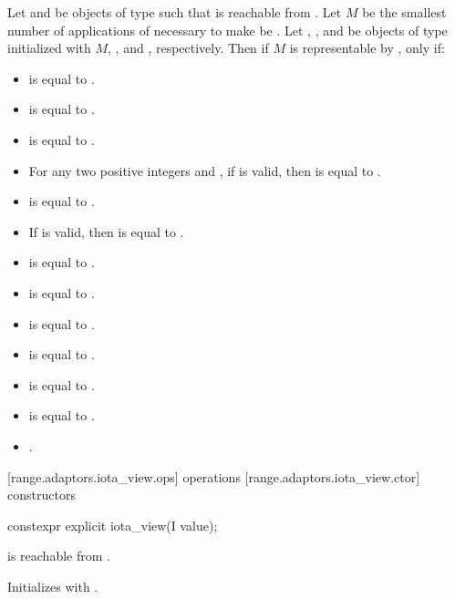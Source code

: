 Let  and  be objects of type  such that  is
reachable from . Let $M$ be the smallest number of applications
of  necessary to make  be . Let
, , and  be objects of type
initialized with $M$, , and , respectively. Then if
$M$ is representable by ,
 only if:
\begin{itemize}
\item {} is equal to .
\item {} is equal to .
\item {} is equal to .
\item For any two positive integers  and , if
 is valid, then  is equal to
.
\item {} is equal to .
\item If  is valid, then  is equal to
.
\item {} is equal to .
\item {} is equal to .
\item {} is equal to .
\item {} is equal to .
\item {} is equal to .
\item {} is equal to .
\item {}.
\end{itemize}

[range.adaptors.iota_view.ops]{ operations}
[range.adaptors.iota_view.ctor]{ constructors}

%
\begin{itemdecl}
constexpr explicit iota_view(I value);
\end{itemdecl}

\begin{itemdescr}
\pnum
\oldtxt{\requires} \newtxt{\expects}
 is reachable from .

\pnum
\effects Initializes  with .
\end{itemdescr}

